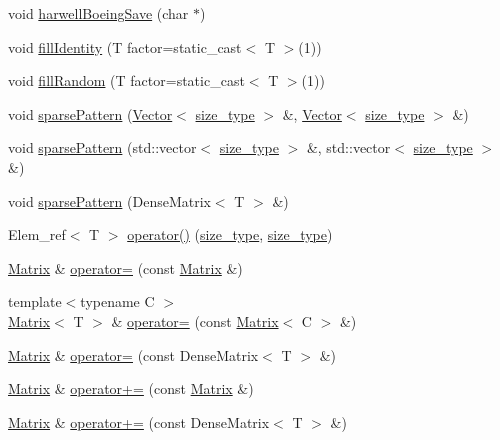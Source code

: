 \begin{DoxyCompactItemize}
void \hyperlink{classMatrix_a268e0e10c50ba9d384bb9b27b1d0ddff}{harwell\-Boeing\-Save} (char $\ast$)
\item 
void \hyperlink{classMatrix_ae8fb2cd5911c80ab80ab5d4cdfce8e4a}{fill\-Identity} (T factor=static\-\_\-cast$<$ T $>$(1))
\item 
void \hyperlink{classMatrix_a42385f8505361bda72faf28e4de0a3bf}{fill\-Random} (T factor=static\-\_\-cast$<$ T $>$(1))
\item 
void \hyperlink{classMatrix_a0d950cdbf1dc0727fe4d63a4c56546d5}{sparse\-Pattern} (\hyperlink{classVector}{Vector}$<$ \hyperlink{lmx__mat__data_8h_a49b489a408a211a90e766329c0732d7b}{size\-\_\-type} $>$ \&, \hyperlink{classVector}{Vector}$<$ \hyperlink{lmx__mat__data_8h_a49b489a408a211a90e766329c0732d7b}{size\-\_\-type} $>$ \&)
\item 
void \hyperlink{classMatrix_ad3c93ffa3e02137fec2ca1cdd98f1d6d}{sparse\-Pattern} (std\-::vector$<$ \hyperlink{lmx__mat__data_8h_a49b489a408a211a90e766329c0732d7b}{size\-\_\-type} $>$ \&, std\-::vector$<$ \hyperlink{lmx__mat__data_8h_a49b489a408a211a90e766329c0732d7b}{size\-\_\-type} $>$ \&)
\item 
void \hyperlink{classMatrix_a0e8c08e59217997921920cc27f3d8956}{sparse\-Pattern} (Dense\-Matrix$<$ T $>$ \&)
\item 
Elem\-\_\-ref$<$ T $>$ \hyperlink{classMatrix_a8c331926ec2fcc7ab5ba866f3f5dd370}{operator()} (\hyperlink{lmx__mat__data_8h_a49b489a408a211a90e766329c0732d7b}{size\-\_\-type}, \hyperlink{lmx__mat__data_8h_a49b489a408a211a90e766329c0732d7b}{size\-\_\-type})
\item 
\hyperlink{classMatrix}{Matrix} \& \hyperlink{classMatrix_a98a12ff384603dcb37d3fc2e56fd747e}{operator=} (const \hyperlink{classMatrix}{Matrix} \&)
\item 
{\footnotesize template$<$typename C $>$ }\\\hyperlink{classMatrix}{Matrix}$<$ T $>$ \& \hyperlink{classMatrix_a9df2b2426e056464d6961957a8330825}{operator=} (const \hyperlink{classMatrix}{Matrix}$<$ C $>$ \&)
\item 
\hyperlink{classMatrix}{Matrix} \& \hyperlink{classMatrix_a25ea1747156c8cdf2adae8da9d3b0b4e}{operator=} (const Dense\-Matrix$<$ T $>$ \&)
\item 
\hyperlink{classMatrix}{Matrix} \& \hyperlink{classMatrix_a675f0713a95f8320bda2d583bf79e7d9}{operator+=} (const \hyperlink{classMatrix}{Matrix} \&)
\item 
\hyperlink{classMatrix}{Matrix} \& \hyperlink{classMatrix_a15cb875d43e397a9138aab19b2f4f935}{operator+=} (const Dense\-Matrix$<$ T $>$ \&)

\end{DoxyCompactItemize}
